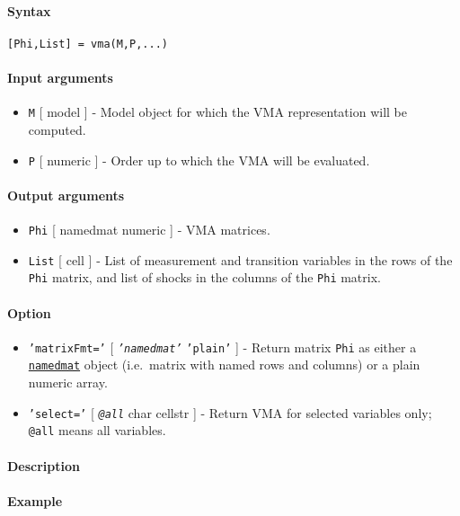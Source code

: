 


	\paragraph{Syntax}\label{syntax}

\begin{verbatim}
[Phi,List] = vma(M,P,...)
\end{verbatim}

\paragraph{Input arguments}\label{input-arguments}

\begin{itemize}
\item
  \texttt{M} {[} model {]} - Model object for which the VMA
  representation will be computed.
\item
  \texttt{P} {[} numeric {]} - Order up to which the VMA will be
  evaluated.
\end{itemize}

\paragraph{Output arguments}\label{output-arguments}

\begin{itemize}
\item
  \texttt{Phi} {[} namedmat \textbar{} numeric {]} - VMA matrices.
\item
  \texttt{List} {[} cell {]} - List of measurement and transition
  variables in the rows of the \texttt{Phi} matrix, and list of shocks
  in the columns of the \texttt{Phi} matrix.
\end{itemize}

\paragraph{Option}\label{option}

\begin{itemize}
\item
  \texttt{'matrixFmt='} {[} \emph{\texttt{'namedmat'}} \textbar{}
  \texttt{'plain'} {]} - Return matrix \texttt{Phi} as either a
  \href{namedmat/Contents}{\texttt{namedmat}} object (i.e.~matrix with
  named rows and columns) or a plain numeric array.
\item
  \texttt{'select='} {[} \emph{\texttt{@all}} \textbar{} char \textbar{}
  cellstr {]} - Return VMA for selected variables only; \texttt{@all}
  means all variables.
\end{itemize}

\paragraph{Description}\label{description}

\paragraph{Example}\label{example}


